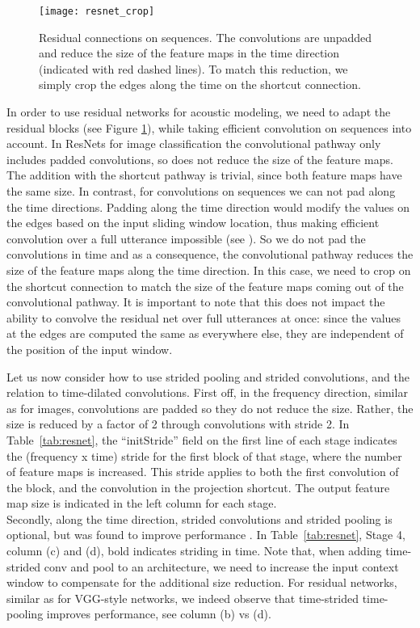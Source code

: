 \documentclass[a4paper]{article}
\begin{document}
\begin{figure}[tb]
  \begin{center}
       \texttt{[image: resnet\_crop]}
       \caption{Residual connections on sequences. The convolutions are unpadded and reduce the size of the feature maps in the time direction (indicated with red dashed lines). 
       To match this reduction, we simply crop the edges along the time on the shortcut connection.}
       \label{fig:resnet}
  \end{center}
\end{figure}

In order to use residual networks for acoustic modeling, we need to adapt the residual blocks (see Figure \ref{fig:resnet}), while taking efficient convolution on sequences into account.
In ResNets for image classification the convolutional pathway only includes padded convolutions, so does not reduce the size of the feature maps.
The addition with the shortcut pathway is trivial, since both feature maps have the same size.
In contrast, for convolutions on sequences we can not pad along the time directions.
Padding along the time direction would modify the values on the edges based on the input sliding window location, thus making efficient convolution over a full utterance impossible (see \cite{sercu2016advances}).
So we do not pad the convolutions in time and as a consequence, the convolutional pathway reduces the size of the feature maps along the time direction.
In this case, we need to crop on the shortcut connection to match the size of the feature maps coming out of the convolutional pathway.
It is important to note that this does not impact the ability to convolve the residual net over full utterances at once:
since the values at the edges are computed the same as everywhere else, they are independent of the position of the input window.

Let us now consider how to use strided pooling and strided convolutions, and the relation to time-dilated convolutions.
First off, in the frequency direction, similar as for images, convolutions are padded so they do not reduce the size.
Rather, the size is reduced by a factor of 2 through convolutions with stride 2.
In Table~\ref{tab:resnet}, the ``initStride'' field on the first line of each stage indicates the (frequency x time) stride for the first block of that stage, where the number of feature maps is increased.
This stride applies to both the first  convolution of the block, and the  convolution in the projection shortcut.
The output feature map size is indicated in the left column for each stage.
\\
Secondly, along the time direction, strided convolutions and strided pooling is optional, but was found to improve performance \cite{sercu2016dense}.
In Table~\ref{tab:resnet}, Stage 4, column (c) and (d), bold indicates striding in time.
Note that, when adding time-strided conv and pool to an architecture, we need to increase the input context window to compensate for the additional size reduction.
For residual networks, similar as for VGG-style networks, we indeed observe that time-strided time-pooling improves performance, see column (b) vs (d).
\end{document}
